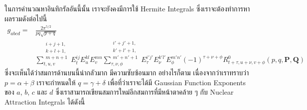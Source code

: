 ในการคำนวณหาอินทิกรัลอันนี้นั้น เราจะยังคงมีการใช้ Hermite Integrals ซึ่งเราจะต้องทำการหาผลรวมดังต่อไปนี้
%
\begin{equation}
  \begin{aligned}
    g_{abcd}
    =
     & \frac{2\pi^{5/2}}{pq\sqrt{p+q}}              \\
     & \sum\limits_{t,u,v}^{\substack{i+j+1,        \\k+l+1, \\m+n+1}}
    E_t^{ij}
    E_u^{kl}
    E_v^{mn}
    \sum\limits_{\tau,\nu,\phi}^{\substack{i'+j'+1, \\k'+l'+1, \\m'+n'+1}}
    E_{\tau}^{i'j'}
    E_{\nu}^{k'l'}
    E_{\phi}^{m'n'}
    (-1)^{\tau+\nu+\phi}
    R^0_{t+\tau, u + \nu, v+\phi}(p,q,\mathbf{P},\mathbf{Q})
  \end{aligned}
\end{equation}
%
ซึ่งจะเห็นได้ว่าสมการด้านบนนี้น่ากลัวมาก มีความซับซ้อนมาก อย่างไรก็ตาม เนื่องจากว่าเราทราบว่า $p = \alpha + \beta$ เราจะกำหนดให้ $q = \gamma + \delta$ เพื่อที่ว่าเราจะได้มี Gaussian Function Exponents ของ $a$, $b$, $c$ และ $d$ ซึ่งเราสามารถเขียนสมการใหม่อีกสมการที่มีหน้าตาคล้าย ๆ กับ Nuclear Attraction Integrals ได้ดังนี้

\vspace{5pt}


